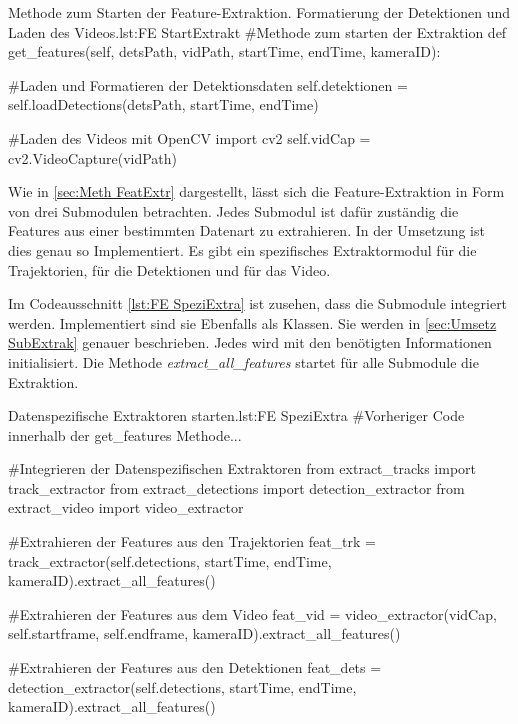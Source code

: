 \begin{pythoncode}{Methode zum Starten der Feature-Extraktion. Formatierung der Detektionen und Laden des Videos.}{lst:FE StartExtrakt}
#Methode zum starten der Extraktion
def get_features(self, detsPath, vidPath, startTime, endTime, kameraID):

    #Laden und Formatieren der Detektionsdaten
    self.detektionen = self.loadDetections(detsPath, startTime, endTime)

    #Laden des Videos mit OpenCV
    import cv2
    self.vidCap = cv2.VideoCapture(vidPath)

\end{pythoncode}

Wie in \ref{sec:Meth FeatExtr} dargestellt, lässt sich die Feature-Extraktion in Form von drei Submodulen betrachten. Jedes Submodul ist dafür zuständig die Features aus einer bestimmten Datenart zu extrahieren. In der Umsetzung ist dies genau so Implementiert. Es gibt ein spezifisches Extraktormodul für die Trajektorien, für die Detektionen und für das Video. \par 

Im Codeausschnitt \ref{lst:FE SpeziExtra} ist zusehen, dass die Submodule integriert werden. Implementiert sind sie Ebenfalls als Klassen. Sie werden in \ref{sec:Umsetz SubExtrak} genauer beschrieben. Jedes wird mit den benötigten Informationen initialisiert. Die Methode \textit{extract\_all\_features} startet für alle Submodule die Extraktion.

\begin{pythoncode}{Datenspezifische Extraktoren starten.}{lst:FE SpeziExtra}
#Vorheriger Code innerhalb der get_features Methode...

#Integrieren der Datenspezifischen Extraktoren
from extract_tracks import track_extractor
from extract_detections import detection_extractor
from extract_video import video_extractor

#Extrahieren der Features aus den Trajektorien
feat_trk = track_extractor(self.detections, 
                          startTime, 
                          endTime, 
                          kameraID).extract_all_features()

#Extrahieren der Features aus dem Video
feat_vid = video_extractor(vidCap, 
                           self.startframe, 
                           self.endframe, 
                           kameraID).extract_all_features()

#Extrahieren der Features aus den Detektionen
feat_dets = detection_extractor(self.detections, 
                                startTime, 
                                endTime, 
                                kameraID).extract_all_features()

\end{pythoncode}

